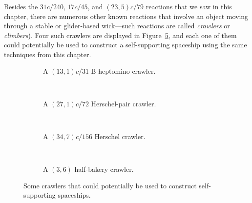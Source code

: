 Besides the $31c/240$, $17c/45$, and $(23,5)c/79$ reactions that we saw in this chapter, there are numerous other known reactions that involve an object moving through a stable or glider-based wick---such reactions are called \emph{crawlers} or \emph{climbers}). Four such crawlers are displayed in Figure~\ref{fig:self_support_climbers}, and each one of them could potentially be used to construct a self-supporting spaceship using the same techniques from this chapter.

\begin{figure}[!htb]
	\centering
	\begin{subfigure}{0.495\textwidth}
		\centering
		\caption{A $(13,1)c/31$ B-heptomino crawler.}\label{fig:13_1c_31_b_heptomino_climber}
	\end{subfigure} \ \ \ \begin{subfigure}{0.475\textwidth}
	 	\centering
	 	\caption{A $(27,1)c/72$ Herschel-pair crawler.}\label{fig:27_1c_72_herschel_climber}
	\end{subfigure} \\[0.2cm]
	\begin{subfigure}{0.495\textwidth}
		\centering
		\caption{A $(34,7)c/156$ Herschel crawler.}\label{fig:34_7c_156_herschel_climber}
	\end{subfigure} \ \ \ \begin{subfigure}{0.475\textwidth}
		\centering
		\caption{A $(3,6)$ half-bakery crawler.}\label{fig:half_bakery_reaction}
	\end{subfigure}
	\caption{Some crawlers that could potentially be used to construct self-supporting spaceships.}\label{fig:self_support_climbers}
\end{figure}

